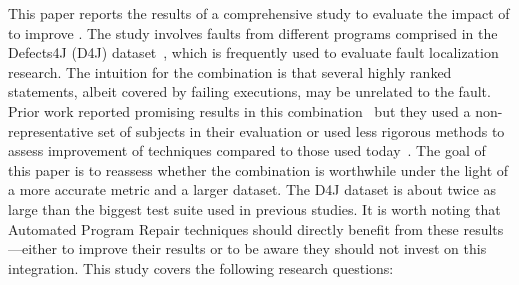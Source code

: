 \documentclass{article}
\begin{document}

This paper reports the results of a comprehensive study
to evaluate the impact of \ds{} to improve \sfl{}. The study involves
\numFaults{} faults from \numPrograms{} different programs comprised in the 
Defects4J (D4J) dataset~\cite{just-defects4j-issta2014}, which is frequently
used to evaluate fault localization research. The intuition for the
\comb{} combination is that several highly ranked statements, albeit
covered by failing executions, may be unrelated to the fault. Prior
work reported promising results in this
combination~\cite{Wotawa:2010:FLB:1848650.1849235,Alves:2011:FUD:2190078.2190115,DBLP:conf/ecai/HoferW12,lei-mao-dai-wang-2012,slicing-sfl-repair}
but they used a non-representative set of subjects in their evaluation
or used less rigorous methods to assess improvement of techniques compared to those used
today~\cite{Wu:2014:CLC:2610384.2610386,Lucia:2014:FFL:2642937.2642983,Wen:2016:LLB:2970276.2970359}.
The goal of this paper is to reassess whether the \comb{} combination
is worthwhile under the light of a more accurate metric and a larger
dataset. The D4J dataset is about twice as large than the biggest test
suite used in previous studies. It is worth noting that Automated
Program Repair techniques should directly benefit from these results---either to
improve their results or to be aware they should not invest on this
integration. This study covers the following research questions:
\end{document}
